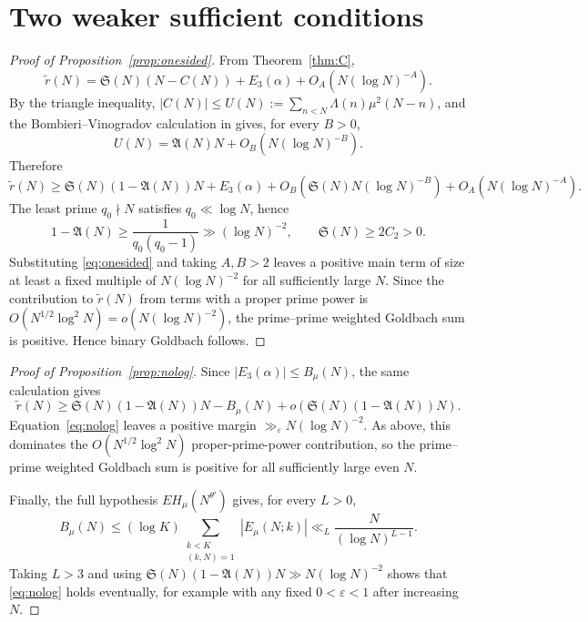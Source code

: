 \documentclass[11pt,a4paper]{article}
\theoremstyle{plain}
\theoremstyle{definition}
\theoremstyle{remark}
\renewcommand{\SS}{\mathfrak{S}}
\newcommand{\AAA}{\mathfrak{A}}
\newcommand{\Emu}{E_\mu}
\begin{document}
\section{Two weaker sufficient conditions}\label{sec:strength}

\begin{proof}[Proof of Proposition~\ref{prop:onesided}]
From Theorem~\ref{thm:C},
\[
 \widetilde r(N)=\SS(N)(N-C(N))+E_3(\alpha)
 +O_A\!\left(N(\log N)^{-A}\right).
\]
By the triangle inequality,
$|C(N)|\le U(N):=\sum_{n<N}\Lambda(n)\mu^2(N-n)$, and the
Bombieri--Vinogradov calculation in \cite[\S3.3]{HL} gives, for every
$B>0$,
\[
 U(N)=\AAA(N)N+O_B\!\left(N(\log N)^{-B}\right).
\]
Therefore
\[
 \widetilde r(N)\ge \SS(N)(1-\AAA(N))N+E_3(\alpha)
 +O_B\!\left(\SS(N)N(\log N)^{-B}\right)
 +O_A\!\left(N(\log N)^{-A}\right).
\]
The least prime $q_0\nmid N$ satisfies $q_0\ll\log N$, hence
\[
 1-\AAA(N)\ge \frac1{q_0(q_0-1)}\gg(\log N)^{-2},
 \qquad \SS(N)\ge 2C_2>0.
\]
Substituting \eqref{eq:onesided} and taking $A,B>2$ leaves a positive
main term of size at least a fixed multiple of $N(\log N)^{-2}$ for
all sufficiently large $N$.  Since the contribution to
$\widetilde r(N)$ from terms with a proper prime power is
$O(N^{1/2}\log^2N)=o(N(\log N)^{-2})$, the prime--prime weighted
Goldbach sum is positive.  Hence binary Goldbach follows.
\end{proof}

\begin{proof}[Proof of Proposition~\ref{prop:nolog}]
Since $|E_3(\alpha)|\le B_\mu(N)$, the same calculation gives
\[
 \widetilde r(N)\ge \SS(N)(1-\AAA(N))N-B_\mu(N)
 +o\!\left(\SS(N)(1-\AAA(N))N\right).
\]
Equation~\eqref{eq:nolog} leaves a positive margin
$\gg_\varepsilon N(\log N)^{-2}$.  As above, this dominates the
$O(N^{1/2}\log^2N)$ proper-prime-power contribution, so the
prime--prime weighted Goldbach sum is positive for all sufficiently
large even $N$.

Finally, the full hypothesis $EH_\mu(N^{\theta'})$ gives, for every
$L>0$,
\[
 B_\mu(N)\le (\log K)
 \sum_{\substack{k<K\\(k,N)=1}}|\Emu(N;k)|
 \ll_L \frac{N}{(\log N)^{L-1}}.
\]
Taking $L>3$ and using
$\SS(N)(1-\AAA(N))N\gg N(\log N)^{-2}$ shows that
\eqref{eq:nolog} holds eventually, for example with any fixed
$0<\varepsilon<1$ after increasing $N$.
\end{proof}

\end{document}
